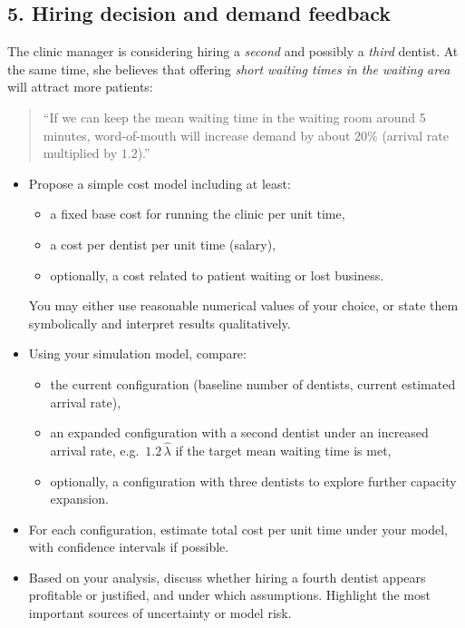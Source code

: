 \documentclass[a4paper,11pt]{article}
\begin{document}
\subsection*{5. Hiring decision and demand feedback}

The clinic manager is considering hiring a \emph{second} and possibly a \emph{third} dentist. At the same time, she believes that offering \emph{short waiting times in the waiting area} will attract more patients:
\begin{quote}
``If we can keep the mean waiting time in the waiting room around 5 minutes, word-of-mouth will increase demand by about $20\%$ (arrival rate multiplied by $1.2$).''
\end{quote}

\begin{itemize}
  \item Propose a simple cost model including at least:
    \begin{itemize}
      \item a fixed base cost for running the clinic per unit time,
      \item a cost per dentist per unit time (salary),
      \item optionally, a cost related to patient waiting or lost business.
    \end{itemize}
    You may either use reasonable numerical values of your choice, or state them symbolically and interpret results qualitatively.
  \item Using your simulation model, compare:
    \begin{itemize}
      \item the current configuration (baseline number of dentists, current estimated arrival rate),
      \item an expanded configuration with a second dentist under an increased arrival rate, e.g.\ $1.2\,\hat\lambda$ if the target mean waiting time is met,
      \item optionally, a configuration with three dentists to explore further capacity expansion.
    \end{itemize}
  \item For each configuration, estimate total cost per unit time under your model, with confidence intervals if possible.
  \item Based on your analysis, discuss whether hiring a fourth dentist appears profitable or justified, and under which assumptions. Highlight the most important sources of uncertainty or model risk.
\end{itemize}
\end{document}
